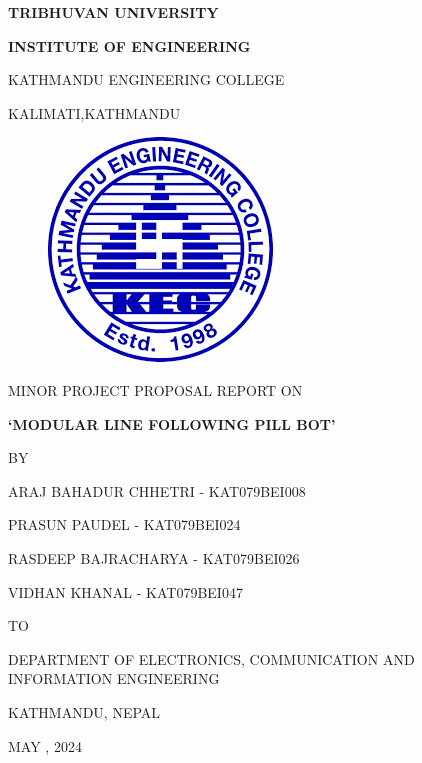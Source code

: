 \begin{titlepage}
    \thispagestyle{empty}
    \begin{center}
    
    \vspace*{\fill} %
    \vspace*{-1cm}
    {\large \textbf{TRIBHUVAN UNIVERSITY
}\par}
{\large \textbf{INSTITUTE OF ENGINEERING
}\par}
\vspace{8pt}
KATHMANDU ENGINEERING COLLEGE

KALIMATI,KATHMANDU
\vspace{24pt}

\begin{figure}[ht]
    \centering
    \includegraphics[scale=0.45]{images/kec.png}
\end{figure}
\vspace{24pt}
{MINOR PROJECT PROPOSAL REPORT ON\par}
\vspace{14pt}
{\textbf{ `MODULAR LINE FOLLOWING PILL BOT'}\par}

\vspace{14pt}
{BY\par}
\vspace{14pt}

{ ARAJ BAHADUR CHHETRI - KAT079BEI008\par}
{ PRASUN PAUDEL - KAT079BEI024\par}
{RASDEEP BAJRACHARYA - KAT079BEI026\par}
{VIDHAN KHANAL - KAT079BEI047\par}

\vspace{24pt}
{TO\par}
\vspace{14pt}
{DEPARTMENT OF ELECTRONICS, COMMUNICATION AND INFORMATION ENGINEERING\par}
{KATHMANDU, NEPAL\par}
{MAY , 2024\par}


    \end{center}
\end{titlepage}